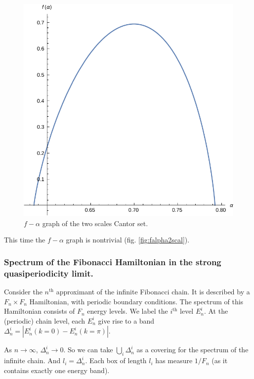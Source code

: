 \documentclass[11pt]{article}
\begin{document}
\begin{figure}[htp]
\centering
\includegraphics[scale=0.70]{f_alpha_2_scales_cantor_set.pdf}
\caption{$f-\alpha$ graph of the two scales Cantor set.}
\label{fig:falpha2scal}
\end{figure}

This time the $f - \alpha$ graph is nontrivial (fig. \eqref{fig:falpha2scal}).

\subsubsection{Spectrum of the Fibonacci Hamiltonian in the strong quasiperiodicity limit.}

Consider the $n^\text{th}$ approximant of the infinite Fibonacci chain. It is described by a $F_n \times F_n$ Hamiltonian, with periodic boundary conditions. The spectrum of this Hamiltonian consists of $F_n$ energy levels. We label the $i^\text{th}$ level $E^i_n$. At the (periodic) chain level, each $E^i_n$ give rise to a band $\Delta^i_n = |E^i_n(k=0) - E^i_n(k=\pi)|$.

As $n \rightarrow \infty$, $\Delta^i_n \rightarrow 0$. So we can take $\bigcup_i \Delta^i_n$ as a covering for the spectrum of the infinite chain. And $l_i = \Delta^i_n$.
Each box of length $l_i$ has measure $1/F_n$ (as it contains exactly one energy band).
\end{document}
